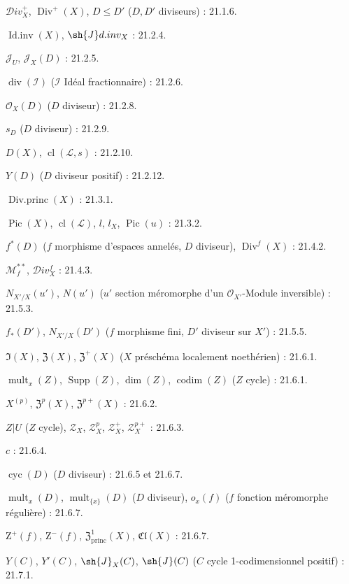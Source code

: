 $\mathcal{D}iv_X^+$, $\operatorname{Div}^+(X)$, $D\leq D'$
($D,D'$ diviseurs) : 21.1.6.

$\operatorname{Id.inv}(X)$, $\sh{J}d.inv_X$ : 21.2.4.

$\mathcal J_U$, $\mathcal J_X(D)$ : 21.2.5.

$\operatorname{div}(\mathcal I)$ ($\mathcal I$ Idéal fractionnaire) : 21.2.6.

$\mathcal O_X(D)$ ($D$ diviseur) : 21.2.8.

$s_D$ ($D$ diviseur) : 21.2.9.

$D(X)$, $\operatorname{cl}(\mathcal L,s)$ : 21.2.10.

$Y(D)$ ($D$ diviseur positif) : 21.2.12.

$\operatorname{Div.princ}(X)$ : 21.3.1.

$\operatorname{Pic}(X)$, $\operatorname{cl}(\mathcal L)$, $l$, $l_X$,
$\operatorname{Pic}(u)$ : 21.3.2.

$f^*(D)$ ($f$ morphisme d'espaces annelés, $D$ diviseur),
$\operatorname{Div}^f(X)$ : 21.4.2.

$\mathcal M_f^{**}$, $\mathcal{D}iv_X^f$ : 21.4.3.

$N_{X'/X}(u')$, $N(u')$
($u'$ section méromorphe d'un $\mathcal O_{X'}$-Module inversible) : 21.5.3.

$f_*(D')$, $N_{X'/X}(D')$
($f$ morphisme fini, $D'$ diviseur sur $X'$) : 21.5.5.

$\mathfrak I(X)$, $\mathfrak Z(X)$, $\mathfrak Z^+(X)$
($X$ préschéma localement noethérien) : 21.6.1.

$\operatorname{mult}_x(Z)$, $\operatorname{Supp}(Z)$,
$\dim(Z)$, $\operatorname{codim}(Z)$ ($Z$ cycle) : 21.6.1.

$X^{(p)}$, $\mathfrak Z^p(X)$, $\mathfrak Z^{p+}(X)$ : 21.6.2.

$Z|U$ ($Z$ cycle), $\mathscr Z_X$, $\mathscr Z_X^p$,
$\mathscr Z_X^+$, $\mathscr Z_X^{p+}$ : 21.6.3.

$c$ : 21.6.4.

$\operatorname{cyc}(D)$ ($D$ diviseur) : 21.6.5 et 21.6.7.

$\operatorname{mult}_x(D)$, $\operatorname{mult}_{\{x\}}(D)$
($D$ diviseur), $o_x(f)$ ($f$ fonction méromorphe régulière) : 21.6.7.

$\mathrm Z^+(f)$, $\mathrm Z^-(f)$, $\mathfrak Z^1_{\mathrm{princ}}(X)$,
$\mathfrak{Cl}(X)$ : 21.6.7.

$Y(C)$, $Y'(C)$, $\sh{J}_X(C)$, $\sh{J}(C)$
($C$ cycle 1-codimensionnel positif) : 21.7.1.

